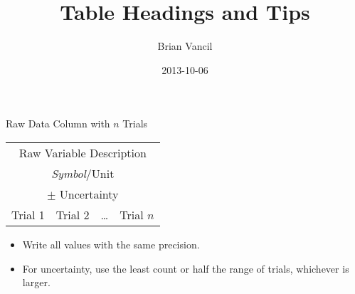 \documentclass[dvipsnames,final]{beamer} %
\title[Tables]{Table Headings and Tips}
\author[Vancil]{Brian Vancil}
\institute[Sumner]{Sumner Academy of Arts & Science}
\date{2013-10-06}
\begin{document}
  \begin{frame}{Raw Data Column with $n$ Trials}
	\begin{center}
		\Huge
		\begin{tabular}{@{}c@{ }c@{ }c@{ }c@{}} \toprule[10pt]
			\multicolumn{4}{c}{\textcolor{description}{Raw Variable Description}} \\
			\multicolumn{4}{c}{\textcolor{symbol}{\textit{Symbol}}/\textcolor{unit}{Unit}} \\
			\multicolumn{4}{c}{$\pm$ Uncertainty}\\
			Trial 1 & Trial 2 & \ldots & Trial $n$ \\
 			\midrule[5pt]
		\end{tabular}
		\Large
		\begin{itemize}
			\item Write all values with the same precision.
			\item For uncertainty, use the least count or half the range of trials, whichever is larger.
		\end{itemize}
	\end{center}
	\end{frame}
\end{document}
